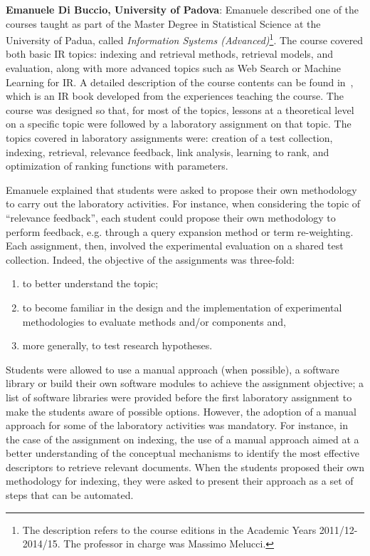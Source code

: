 {\bf Emanuele Di Buccio, University of Padova}:  Emanuele described one of the courses taught as part of the Master Degree in Statistical Science at the University of Padua, called {\em Information Systems (Advanced)}\footnote{\scriptsize{The description refers to the course editions in the Academic Years 2011/12-2014/15. The professor in charge was Massimo Melucci.}}.
The course covered both basic IR topics: indexing and retrieval methods, retrieval models, and evaluation, along with more advanced topics such as Web Search or Machine Learning for IR. A detailed description of the course contents can be found in~\cite{Melucci2013}, which is an IR book developed from the experiences teaching the course.
The course was designed so that, for most of the topics, lessons at a theoretical level on a specific topic were followed by a laboratory assignment on that topic. The topics covered in laboratory assignments were: 
creation of a test collection, 
indexing, 
retrieval, 
relevance feedback, 
link analysis, 
learning to rank, and
optimization of ranking functions with parameters. 

Emanuele explained that students were asked to propose their own methodology to carry out the laboratory activities. For instance, when considering the topic of ``relevance feedback'', each student could propose their own methodology to perform feedback, e.g. through a query expansion method or term re-weighting. Each assignment, then, involved the experimental evaluation on a shared test collection. Indeed, the objective of the assignments was three-fold:
\begin{enumerate}
	\item to better understand the topic; 
	\item to become familiar in the design and the implementation of experimental methodologies to evaluate methods and/or components and, 
	\item more  generally, to test research hypotheses.
\end{enumerate}

Students were allowed to use a manual approach (when possible), a software library or build their own software modules to achieve the assignment objective; a list of software libraries were provided before the first laboratory assignment to make the students aware of possible options.
However, the adoption of a manual approach for some of the laboratory activities was mandatory. For instance, in the case of the assignment on indexing, the use of a manual approach aimed at a better understanding of the conceptual mechanisms to identify the most effective descriptors to retrieve relevant documents. When the students proposed their own methodology for indexing, they were asked to present their approach as a set of steps that can be automated.

